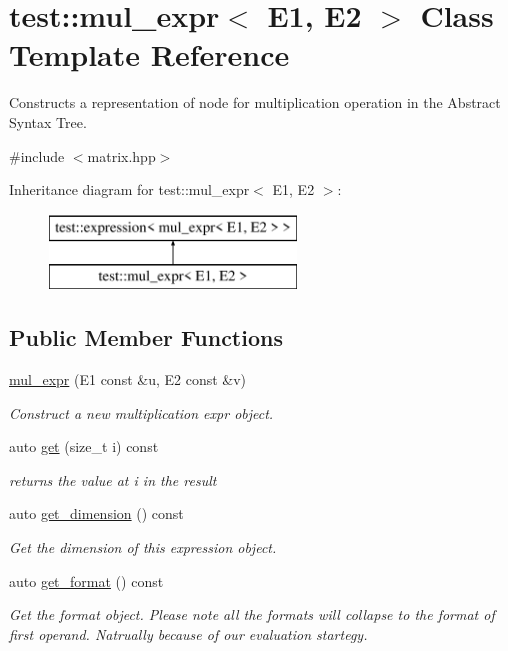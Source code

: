 \hypertarget{classtest_1_1mul__expr}{}\section{test\+::mul\+\_\+expr$<$ E1, E2 $>$ Class Template Reference}
\label{classtest_1_1mul__expr}


Constructs a representation of node for multiplication operation in the Abstract Syntax Tree.  




{\ttfamily \#include $<$matrix.\+hpp$>$}

Inheritance diagram for test\+::mul\+\_\+expr$<$ E1, E2 $>$\+:\begin{figure}[H]
\begin{center}
\leavevmode
\includegraphics[height=2.000000cm]{classtest_1_1mul__expr}
\end{center}
\end{figure}
\subsection*{Public Member Functions}
\begin{DoxyCompactItemize}
\item 
\mbox{\hyperlink{classtest_1_1mul__expr_ae8204767f3a1949c0281316869175e67}{mul\+\_\+expr}} (E1 const \&u, E2 const \&v)
\begin{DoxyCompactList}\small\item\em Construct a new multiplication expr object. \end{DoxyCompactList}\item 
auto \mbox{\hyperlink{classtest_1_1mul__expr_a7a1db865b69e8e73af85254fb7a932cf}{get}} (size\+\_\+t i) const
\begin{DoxyCompactList}\small\item\em returns the value at i in the result \end{DoxyCompactList}\item 
auto \mbox{\hyperlink{classtest_1_1mul__expr_ad49468b3924a80f558747daf702505ae}{get\+\_\+dimension}} () const
\begin{DoxyCompactList}\small\item\em Get the dimension of this expression object. \end{DoxyCompactList}\item 
auto \mbox{\hyperlink{classtest_1_1mul__expr_a927a3ccb592d38d0d36d882ffbae3318}{get\+\_\+format}} () const
\begin{DoxyCompactList}\small\item\em Get the format object. Please note all the formats will collapse to the format of first operand. Natrually because of our evaluation startegy. \end{DoxyCompactList}\end{DoxyCompactItemize}



